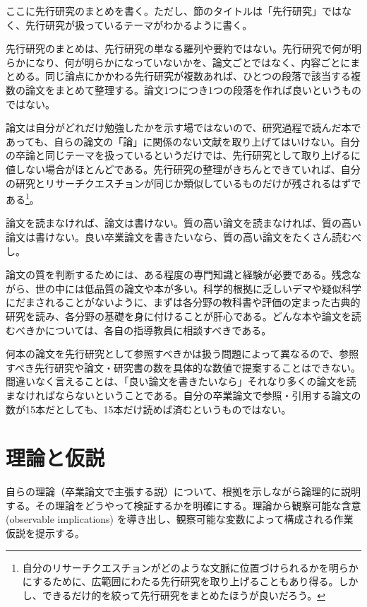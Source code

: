 \documentclass[10.5pt,a4paper,lualatex,ja=standard]{bxjsarticle}
\begin{document}
ここに先行研究のまとめを書く。ただし、節のタイトルは「先行研究」ではなく、先行研究が扱っているテーマがわかるように書く。

先行研究のまとめは、先行研究の単なる羅列や要約ではない。先行研究で何が明らかになり、何が明らかになっていないかを、論文ごとではなく、内容ごとにまとめる。同じ論点にかかわる先行研究が複数あれば、ひとつの段落で該当する複数の論文をまとめて整理する。論文1つにつき1つの段落を作れば良いというものではない。

論文は自分がどれだけ勉強したかを示す場ではないので、研究過程で読んだ本であっても、自らの論文の「論」に関係のない文献を取り上げてはいけない。自分の卒論と同じテーマを扱っているというだけでは、先行研究として取り上げるに値しない場合がほとんどである。先行研究の整理がきちんとできていれば、自分の研究とリサーチクエスチョンが同じか類似しているものだけが残されるはずである\footnote{自分のリサーチクエスチョンがどのような文脈に位置づけられるかを明らかにするために、広範囲にわたる先行研究を取り上げることもあり得る。しかし、できるだけ的を絞って先行研究をまとめたほうが良いだろう。}。

論文を読まなければ、論文は書けない。質の高い論文を読まなければ、質の高い論文は書けない。良い卒業論文を書きたいなら、質の高い論文をたくさん読むべし。

論文の質を判断するためには、ある程度の専門知識と経験が必要である。残念ながら、世の中には低品質の論文や本が多い。科学的根拠に乏しいデマや疑似科学にだまされることがないように、まずは各分野の教科書や評価の定まった古典的研究を読み、各分野の基礎を身に付けることが肝心である。どんな本や論文を読むべきかについては、各自の指導教員に相談すべきである。

何本の論文を先行研究として参照すべきかは扱う問題によって異なるので、参照すべき先行研究や論文・研究書の数を具体的な数値で提案することはできない。間違いなく言えることは、「良い論文を書きたいなら」それなり多くの論文を読まなければならないということである。自分の卒業論文で参照・引用する論文の数が15本だとしても、15本だけ読めば済むというものではない。

\section{理論と仮説}\label{ux7406ux8ad6ux3068ux4eeeux8aac}

自らの理論（卒業論文で主張する説）について、根拠を示しながら論理的に説明する。その理論をどうやって検証するかを明確にする。理論から観察可能な含意 (observable implications) を導き出し、観察可能な変数によって構成される作業仮説を提示する。
\end{document}
